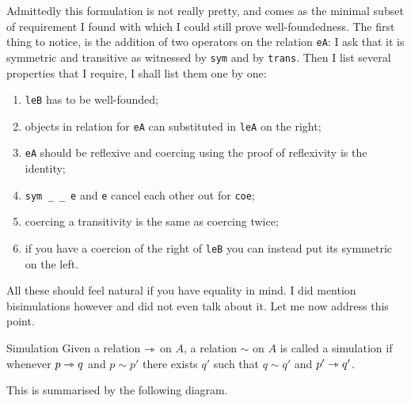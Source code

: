 Admittedly this formulation is not really pretty, and comes as the minimal
subset of requirement I found with which I could still prove well-foundedness.
The first thing to notice, is the addition of two operators on the relation
\texttt{eA}: I ask that it is symmetric and transitive as witnessed
by \texttt{sym} and by \texttt{trans}.
Then I list several properties that I require, I shall list them one by one:
\begin{enumerate}[label=(\roman*)]
  \item \texttt{leB} has to be well-founded;
  \item \label{item:dlexmod-sim} objects in relation for \texttt{eA}
  can substituted in \texttt{leA} on the right;
  \item \texttt{eA} should be reflexive and coercing using the proof
  of reflexivity is the identity;
  \item \texttt{sym _ _ e} and \texttt{e} cancel each other
  out for \texttt{coe};
  \item coercing a transitivity is the same as coercing twice;
  \item if you have a coercion of the right of \texttt{leB} you can
  instead put its symmetric on the left.
\end{enumerate}

All these should feel natural if you have equality in mind.
I did mention bisimulations however and did not even talk about it.
Let me now address this point.

\begin{definition}{Simulation}
  Given a relation \(\rightarrowtriangle\) on \(A\), a relation \(\sim\) on \(A\) is called a
  simulation if whenever \(p \rightarrowtriangle q\) and \(p \sim p'\) there exists \(q'\)
  such that \(q \sim q'\) and \(p' \rightarrowtriangle q'\).
\end{definition}

This is summarised by the following diagram.
\begin{center}
\end{center}

